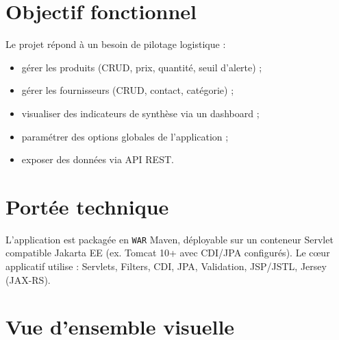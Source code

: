 \documentclass[12pt,a4paper]{report}
\begin{document}
\section{Objectif fonctionnel}
Le projet r\'epond \`a un besoin de pilotage logistique :
\begin{itemize}[leftmargin=1.2cm]
    \item g\'erer les produits (CRUD, prix, quantit\'e, seuil d'alerte) ;
    \item g\'erer les fournisseurs (CRUD, contact, cat\'egorie) ;
    \item visualiser des indicateurs de synth\`ese via un dashboard ;
    \item param\'etrer des options globales de l'application ;
    \item exposer des donn\'ees via API REST.
\end{itemize}

\section{Port\'ee technique}
L'application est packag\'ee en \texttt{WAR} Maven, d\'eployable sur un conteneur Servlet compatible Jakarta EE (ex. Tomcat 10+ avec CDI/JPA configur\'es). Le cœur applicatif utilise : Servlets, Filters, CDI, JPA, Validation, JSP/JSTL, Jersey (JAX-RS).

\section{Vue d'ensemble visuelle}
\begin{center}
\end{center}
\end{document}
